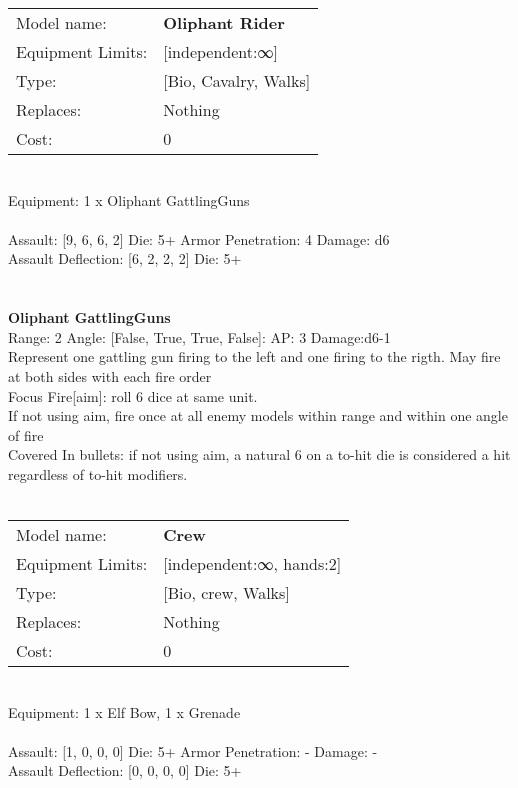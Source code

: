 \noindent
\begin{tabular}{ll}
Model name: &{\bf Oliphant Rider } \\
Equipment Limits: &[independent:∞] \\
Type: &[Bio, Cavalry, Walks] \\
Replaces: &Nothing \\
Cost: & 0\\
\end{tabular}
\ \\
Equipment: 1 x Oliphant GattlingGuns \\
\ \\
Assault: [9, 6, 6, 2] Die: 5+ Armor Penetration: 4 Damage: d6 \\
Assault Deflection: [6, 2, 2, 2] Die: 5+\\
\indent  
\ \\

\ \\
{\bf Oliphant GattlingGuns } \\



Range: 2  Angle: [False, True, True, False]: AP: 3 Damage:d6-1 \\
Represent one gattling gun firing to the left and one firing to the rigth. May fire at both sides with each fire order\\ 
Focus Fire[aim]: roll 6 dice at same unit.\\ 
If not using aim, fire once at all enemy models within range and within one angle of fire\\ 
Covered In bullets: if not using aim, a natural 6 on a to-hit die is considered a hit regardless of to-hit modifiers.\\ 




 
\ \\

\noindent
\begin{tabular}{ll}
Model name: &{\bf Crew } \\
Equipment Limits: &[independent:∞, hands:2] \\
Type: &[Bio, crew, Walks] \\
Replaces: &Nothing \\
Cost: & 0\\
\end{tabular}
\ \\
Equipment: 1 x Elf Bow, 1 x Grenade \\
\ \\
Assault: [1, 0, 0, 0] Die: 5+ Armor Penetration: - Damage: - \\
Assault Deflection: [0, 0, 0, 0] Die: 5+\\
\indent  
\ \\

